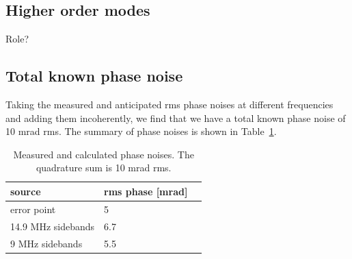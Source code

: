 \documentclass{ligodoc}
\begin{document}
\subsection{Higher order modes}
Role?







\subsection{Total known phase noise}
Taking the measured and anticipated rms phase noises at different
frequencies and adding them incoherently, we find that we have a total
known phase noise of 10 mrad rms. The summary of phase noises is shown
in Table~\ref{tab:phasenoises}.

\begin{table}
\centering
\caption{Measured and calculated phase noises. The quadrature sum is
  10 mrad rms.}
\begin{tabular}{l l l}
\hline
source & rms phase [mrad]\\
\hline
error point & 5 \\
14.9 MHz sidebands & 6.7 \\
9 MHz sidebands & 5.5 \\
\hline
\end{tabular}
\label{tab:phasenoises}
\end{table}
\end{document}
